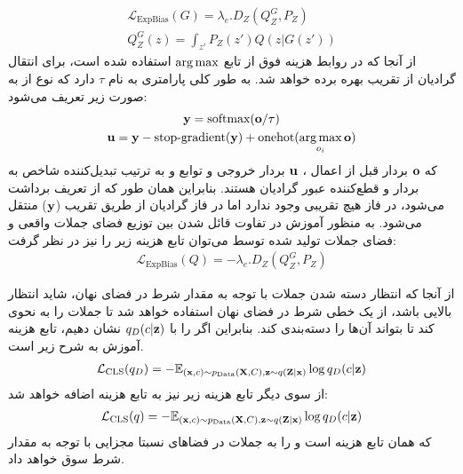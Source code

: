 \begin{gather}
	\mathcal{L}_\text{ExpBias}(G) = \lambda_{e} . D_ Z(Q_Z^G, P_Z)
	\\
	Q_Z^G (z) = \int_{z'} P_Z(z') Q(z|G(z'))
\end{gather}
از آنجا که در روابط هزینه فوق از تابع $\operatorname*{arg\,max}$ استفاده شده است، برای انتقال گرادیان از تقریب  بهره برده خواهد شد.   به طور کلی پارامتری به نام $\tau$ دارد که نوع  از به صورت زیر تعریف می‌شود:
\begin{gather}
	{\bf y} = \text{softmax}({\bf o}/\tau)
	\\
	{\bf u} = {\bf y} - \text{stop-gradient}({\bf y}) + \text{onehot}(\operatorname*{arg\,max}_{o_i} {\bf o})
\end{gather}
که ${\bf o}$ بردار قبل از اعمال 
،
${\bf u}$
بردار خروجی و توابع  و  به ترتیب تبدیل‌کننده شاخص به بردار
و قطع‌کننده عبور گرادیان هستند. بنابراین همان طور که از تعریف برداشت می‌شود، در فاز
هیچ تقریبی وجود ندارد اما در فاز
گرادیان از طریق تقریب 
(${\bf y}$)
منتقل می‌شود.
به منظور آموزش \encoder{} در تفاوت قائل شدن بین توزیع فضای جملات واقعی و فضای جملات تولید شده توسط \decoder{} می‌توان تابع هزینه زیر را نیز در نظر گرفت:
\begin{gather}
	\mathcal{L}_\text{ExpBias}(Q) = -\lambda_{e} . D_ Z(Q_Z^G, P_Z)
\end{gather}
\fi

از آنجا که انتظار دسته شدن جملات با توجه به مقدار شرط در فضای نهان، شاید انتظار بالایی باشد، از یک \classifier{} خطی شرط در فضای نهان استفاده خواهد شد تا \encoder{} جملات را به نحوی \encode{} کند تا \classifier{} بتواند آن‌ها را دسته‌بندی کند. بنابراین اگر \classifier{} را با $q_D(c|{\bf z})$ نشان دهیم، تابع هزینه آموزش \classifier{} به شرح زیر است.
\begin{align}
    {\mathcal{L}}_\text{CLS} (q_D) = -\mathbb E_{({\bf x}, c) \sim p_\text{Data}({\bf X},C) , {\bf z} \sim q({\bf Z}|{\bf x})} \log q_D(c | {\bf z})
\end{align}
از سوی دیگر تابع هزینه زیر نیز به تابع هزینه \encoder{} اضافه خواهد شد:
\begin{align}
{\mathcal{L}}_\text{CLS} (q) = -\mathbb E_{({\bf x}, c) \sim p_\text{Data}({\bf X},C) , {\bf z} \sim q({\bf Z}|{\bf x})} \log q_D(c | {\bf z})
\end{align}
که همان تابع هزینه \classifier{} است و \encoder{} را به \encode{} جملات در فضاهای نسبتا مجزایی با توجه به مقدار شرط سوق خواهد داد.

